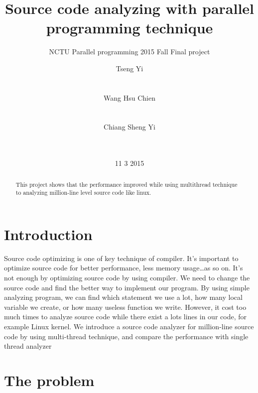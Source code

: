 \documentclass{acm_proc_article-sp}
\begin{document}
\title{Source code analyzing with parallel programming technique}
\subtitle{NCTU Parallel programming 2015 Fall Final project}

\author{
\alignauthor
Tseng Yi\\
       \\
       \\
\alignauthor
Wang Hsu Chien\\
       \\
       \\
\alignauthor
Chiang Sheng Yi\\
       \\
       \\
}

\date{11 3 2015}

\maketitle
\begin{abstract}
       This project shows that the performance improved while using multithread technique
       to analyzing million-line level source code like linux.
\end{abstract}


\section{Introduction}
       Source code optimizing is one of key technique of compiler. 
       It's important to optimize source code for better performance, 
       less memory usage\ldots as so on. It's not enough by optimizing 
       source code by using compiler. We need to change the source 
       code and find the better way to implement our program. By 
       using simple analyzing program, we can find which statement we 
       use a lot, how many local variable we create, or how many useless 
       function we write. However, it cost too much times to analyze source 
       code while there exist a lots lines in our code, for example Linux kernel.
       We introduce a source code analyzer for million-line source code
       by using multi-thread technique, and compare the performance with 
       single thread analyzer


\section{The problem}
\end{document}
